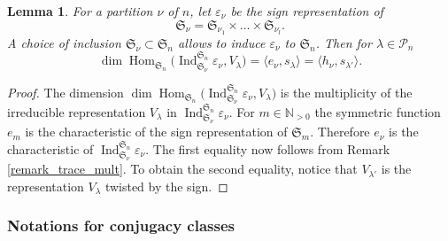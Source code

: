 \documentclass[JEP,XML,SOM,NoEqCountersInSection,Unicode,published]{cedram}
\let\epsilon\varepsilon
\theoremstyle{definition}
\theoremstyle{plain}
\newtheorem{lemma}[definition]{Lemma}
\DeclareMathOperator{\Hom}{Hom}
\DeclareMathOperator{\Ind}{Ind}
\newcommand{\Sym}{\mathfrak{S}}
\newcommand{\Part}{\mathcal{P}}
\begin{document}
\begin{lemma}\label{lemma_ind_sign}
For a partition $\nu$ of $n$, let $\epsilon_{\nu}$ be the sign representation of
\[
\Sym_{\nu}=\Sym_{\nu_1}\times\dots\times \Sym_{\nu_l}.
\]
A choice of inclusion $\Sym_{\nu}\subset \Sym_n$ allows to induce $\epsilon_{\nu}$ to $\Sym_n$. Then for $\lambda\in\Part_n$
\[
\dim \Hom_{\Sym_n} \bigl(\Ind_{\Sym_{\nu}}^{\Sym_n} \epsilon_{\nu}, V_{\lambda}\bigr)=\langle e_{\nu},s_{\lambda}\rangle =\langle h_{\nu},s_{\lambda'}\rangle.
\]
\end{lemma}
\begin{proof}
The dimension $\dim \Hom_{\Sym_n} \bigl(\Ind_{\Sym_{\nu}}^{\Sym_n} \epsilon_{\nu}, V_{\lambda}\bigr)$ is the multiplicity of the irreducible representation $V_{\lambda}$ in $\Ind_{\Sym_{\nu}}^{\Sym_n} \epsilon_{\nu}$. For $m\in \mathbb{N}_{>0}$ the symmetric function $e_{m}$ is the characteristic of the sign representation of $\Sym_m$. Therefore $e_{\nu}$ is the characteristic of $\Ind_{\Sym_{\nu}}^{\Sym_n} \epsilon_{\nu}$. The first equality now follows from Remark \ref{remark_trace_mult}.
To obtain the second equality, notice that $V_{\lambda'}$ is the representation $V_{\lambda}$ twisted by the sign.
\end{proof}

\label{sect_conjugacy_classes}
\subsubsection{Notations for conjugacy classes}\label{subsect_notations_adjoint_conj}
\end{document}
